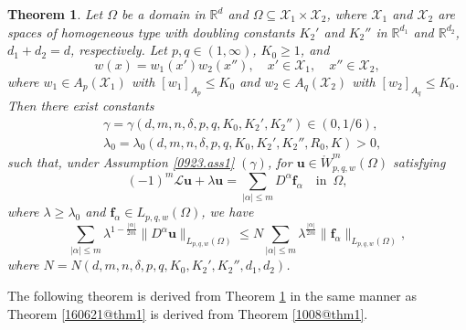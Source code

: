 \documentclass[reqno]{amsart}
\numberwithin{equation}{section}
\theoremstyle{plain}
\newtheorem{theorem}{Theorem}[section]
\theoremstyle{definition}
\theoremstyle{remark}
\begin{document}
\begin{theorem}		\label{160622@thm1}
Let $\Omega$ be a domain in ${\mathbb{R}}^d$  and $ \Omega\subseteq {\mathcal{X}}_1 \times {\mathcal{X}}_2$, where ${\mathcal{X}}_1$ and $ {\mathcal{X}}_2$ are  spaces of homogeneous type with  doubling constants $K_2'$ and $K_2''$ in ${\mathbb{R}}^{d_1}$ and ${\mathbb{R}}^{d_2}$, $d_1+d_2=d$, respectively.
Let $p,q\in (1,\infty)$, $K_0\ge 1$, and 
$$
w(x)=w_1(x')w_2(x''), \quad x'\in {\mathcal{X}}_1, \quad x''\in {\mathcal{X}}_2,
$$
where $w_1\in A_p({\mathcal{X}}_1)$ with $[w_1]_{A_p}\le K_0$ and $w_2\in A_q( {\mathcal{X}}_2)$ with $[w_2]_{A_q}\le K_0$.
Then there exist constants
\begin{align*}
&\gamma=\gamma(d,m,n,\delta,p,q,K_0, K_2', K_2'')\in (0,1/6),\\
&\lambda_0=\lambda_0(d,m,n,\delta,p,q,K_0, K_2',K_2'',R_0,K)>0,
\end{align*}
such that, under Assumption \ref{0923.ass1} $(\gamma)$, for ${\boldsymbol{u}}\in \mathring{W}^m_{p,q,w}(\Omega)$ satisfying 
\begin{equation}		\label{160622@@eq1}
(-1)^m{\mathcal{L}}{\boldsymbol{u}}+\lambda{\boldsymbol{u}}=\sum_{|\alpha| \le m}D^\alpha {\boldsymbol{f}}_\alpha \quad \text{in }\, \Omega, 
\end{equation}
where $\lambda\ge \lambda_0$ and ${\boldsymbol{f}}_\alpha\in L_{p,q,w}(\Omega)$, we have 
$$
\sum_{|\alpha| \le m}\lambda^{1-\frac{|\alpha|}{2m}}\|D^\alpha {\boldsymbol{u}}\|_{L_{p,q,w}(\Omega)}\le N\sum_{|\alpha| \le m}\lambda^{\frac{|\alpha|}{2m}}\|{\boldsymbol{f}}_\alpha\|_{L_{p,q,w}(\Omega)},
$$
where $N=N(d,m,n,\delta,p,q,K_0, K_2', K_2'',d_1,d_2)$.
\end{theorem}

The following theorem is derived from Theorem \ref{160622@thm1} in the same manner as Theorem \ref{160621@thm1} is derived from Theorem \ref{1008@thm1}.
\end{document}

